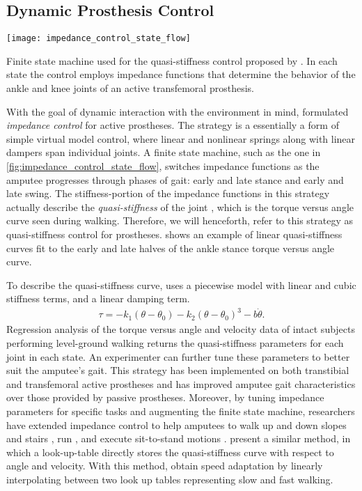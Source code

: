 \subsection{Dynamic Prosthesis Control}\label{sec:back_dynamic_pros_control}
\begin{marginfigure}[-0.5in]
    \centering
    \texttt{[image: impedance\_control\_state\_flow]}
    \caption{Finite state machine used for the quasi-stiffness control proposed
    by \citet{sup2007design}. In each state the control employs impedance
    functions that determine the behavior of the ankle and knee joints of an
    active transfemoral prosthesis.}
    \label{fig:impedance_control_state_flow}
\end{marginfigure}
With the goal of dynamic interaction with the environment in mind,
\citet{sup2007design} formulated \emph{impedance control} for active prostheses.
The strategy is a essentially a form of simple virtual model control, where
linear and nonlinear springs along with linear dampers span individual joints.
A finite state machine, such as the one in
\cref{fig:impedance_control_state_flow}, switches impedance functions as the
amputee progresses through phases of gait: early and late stance and early and
late swing. The stiffness-portion of the impedance functions in this strategy
actually describe the \emph{quasi-stiffness} of the joint
\citep{rouse2013difference}, which is the torque versus angle curve seen during
walking.  Therefore, we will henceforth, refer to this strategy as
quasi-stiffness control for prostheses.   shows
an example of linear quasi-stiffness curves fit to the early and late halves of
the ankle stance torque versus angle curve.

To describe the quasi-stiffness curve, \citet{sup2008design} uses a piecewise
model with linear and cubic stiffness terms, and a linear damping term.
\begin{align}
    \tau = -k_1 (\theta - \theta_0) - k_2 (\theta - \theta_0)^3 - b \dot \theta.
\end{align}
Regression analysis of the torque versus angle and velocity data of intact
subjects performing level-ground walking returns the quasi-stiffness parameters
for each joint in each state. An experimenter can further tune these parameters
to better suit the amputee's gait. 
This strategy has been implemented on both transtibial \citep{shultz2014walking}
and transfemoral \citep{lawson2014robotic} active prostheses and has improved
amputee gait characteristics over those provided by passive prostheses.
Moreover, by tuning impedance parameters for specific tasks and augmenting the
finite state machine, researchers have extended impedance control to help
amputees to walk up and down slopes \citep{sup2011upslope} and stairs
\citep{lawson2013control}, run \citep{huff2012running, shultz2015running}, and
execute sit-to-stand motions \citep{varol2009powered}.  \citet{lenzi2014speed}
present a similar method, in which a look-up-table directly stores the
quasi-stiffness curve with respect to angle and velocity.  With this method,
\citeauthor{lenzi2014speed} obtain speed adaptation by linearly interpolating
between two look up tables representing slow and fast walking.

